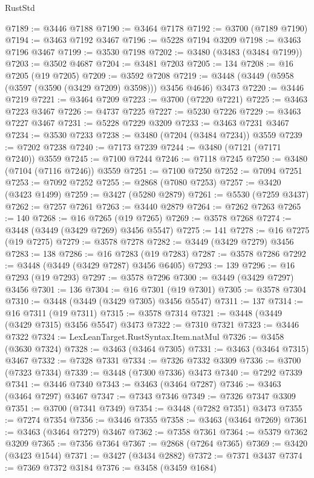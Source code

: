\begin{lexlean}{RustStd}
\begin{coremodule}
{{{{{{{{{{{{{{{{{{{@7189 := @3446 @7188
@7190 := @3464 @7178
@7192 := @3700 (@7189 @7190)
@7194 := @3463 @7192 @3467
@7196 := @5228 @7194 @3209
@7198 := @3463 @7196 @3467
@7199 := @3530 @7198
@7202 := @3480 (@3483 (@3484 @7199))
@7203 := @3502 @4687
@7204 := @3481 @7203
@7205 := 134
@7208 := @16 @7205 (@19 @7205)
@7209 := @3592 @7208
@7219 := @3448 (@3449 (@5958 (@3597 (@3590 (@3429 @7209) @3598))) @3456 @4646) @3473
@7220 := @3446 @7219
@7221 := @3464 @7209
@7223 := @3700 (@7220 @7221)
@7225 := @3463 @7223 @3467
@7226 := @4737 @7225
@7227 := @5230 @7226
@7229 := @3463 @7227 @3467
@7231 := @5228 @7229 @3209
@7233 := @3463 @7231 @3467
@7234 := @3530 @7233
@7238 := @3480 (@7204 (@3484 @7234)) @3559
@7239 := @7202 @7238
@7240 := @7173 @7239
@7244 := @3480 (@7121 (@7171 @7240)) @3559
@7245 := @7100 @7244
@7246 := @7118 @7245
@7250 := @3480 (@7104 (@7116 @7246)) @3559
@7251 := @7100 @7250
@7252 := @7094 @7251
@7253 := @7092 @7252
@7255 := @2868 (@7080 @7253)
@7257 := @3420 (@3423 @1499)
@7259 := @3427 (@5280 @2879)
@7261 := @5530 (@7259 @3437)
@7262 := @7257 @7261
@7263 := @3440 @2879
@7264 := @7262 @7263
@7265 := 140
@7268 := @16 @7265 (@19 @7265)
@7269 := @3578 @7268
@7274 := @3448 (@3449 (@3429 @7269) @3456 @5547)
@7275 := 141
@7278 := @16 @7275 (@19 @7275)
@7279 := @3578 @7278
@7282 := @3449 (@3429 @7279) @3456
@7283 := 138
@7286 := @16 @7283 (@19 @7283)
@7287 := @3578 @7286
@7292 := @3448 (@3449 (@3429 @7287) @3456 @6405)
@7293 := 139
@7296 := @16 @7293 (@19 @7293)
@7297 := @3578 @7296
@7300 := @3449 (@3429 @7297) @3456
@7301 := 136
@7304 := @16 @7301 (@19 @7301)
@7305 := @3578 @7304
@7310 := @3448 (@3449 (@3429 @7305) @3456 @5547)
@7311 := 137
@7314 := @16 @7311 (@19 @7311)
@7315 := @3578 @7314
@7321 := @3448 (@3449 (@3429 @7315) @3456 @5547) @3473
@7322 := @7310 @7321
@7323 := @3446 @7322
@7324 := LexLeanTarget.RustSyntax.Item.natMul
@7326 := @3458 (@3630 @7324)
@7328 := @3463 (@3464 @7305)
@7331 := @3463 (@3464 @7315) @3467
@7332 := @7328 @7331
@7334 := @7326 @7332 @3309
@7336 := @3700 (@7323 @7334)
@7339 := @3448 (@7300 @7336) @3473
@7340 := @7292 @7339
@7341 := @3446 @7340
@7343 := @3463 (@3464 @7287)
@7346 := @3463 (@3464 @7297) @3467
@7347 := @7343 @7346
@7349 := @7326 @7347 @3309
@7351 := @3700 (@7341 @7349)
@7354 := @3448 (@7282 @7351) @3473
@7355 := @7274 @7354
@7356 := @3446 @7355
@7358 := @3463 (@3464 @7269)
@7361 := @3463 (@3464 @7279) @3467
@7362 := @7358 @7361
@7364 := @5379 @7362 @3209
@7365 := @7356 @7364
@7367 := @2868 (@7264 @7365)
@7369 := @3420 (@3423 @1544)
@7371 := @3427 (@3434 @2882)
@7372 := @7371 @3437
@7374 := @7369 @7372 @3184
@7376 := @3458 (@3459 @1684)
}}}}}}}}}}}}}}}}}}}
\end{coremodule}
\end{lexlean}
